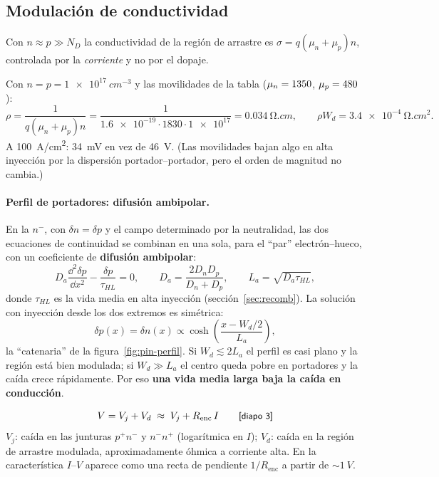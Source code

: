 \subsection{Modulación de conductividad}

Con $n\approx p\gg N_D$ la conductividad de la región de arrastre es
$\sigma=q(\mu_n+\mu_p)n$, controlada por la \emph{corriente} y no por el dopaje.

\begin{ejemplo}
Con $n=p=\SI{1e17}{cm^{-3}}$ y las movilidades de la tabla ($\mu_n=1350$, $\mu_p=480$):
\[
  \rho=\frac{1}{q(\mu_n+\mu_p)n}=\frac{1}{\num{1.6e-19}\cdot1830\cdot\num{1e17}}=\SI{0.034}{\ohm.cm},
  \qquad
  \rho W_d=\SI{3.4e-4}{\ohm.cm^2}.
\]
A \SI{100}{A/cm^2}: \SI{34}{mV} en vez de \SI{46}{V}. (Las movilidades bajan algo en alta
inyección por la dispersión portador--portador, pero el orden de magnitud no cambia.)
\end{ejemplo}

\paragraph{Perfil de portadores: difusión ambipolar.}
En la $n^-$, con $\delta n=\delta p$ y el campo determinado por la neutralidad, las dos ecuaciones
de continuidad se combinan en una sola, para el ``par'' electrón--hueco, con un coeficiente de
\textbf{difusión ambipolar}:
\[
  D_a\frac{\dd^2\delta p}{\dd x^2}-\frac{\delta p}{\tau_{HL}}=0,
  \qquad D_a=\frac{2D_nD_p}{D_n+D_p},\qquad L_a=\sqrt{D_a\tau_{HL}},
\]
donde $\tau_{HL}$ es la vida media en alta inyección (sección~\ref{sec:recomb}). La solución con
inyección desde los dos extremos es simétrica:
\[
  \delta p(x)=\delta n(x)\propto\cosh\!\left(\frac{x-W_d/2}{L_a}\right),
\]
la ``catenaria'' de la figura~\ref{fig:pin-perfil}. Si $W_d\lesssim 2L_a$ el perfil es casi plano y la
región está bien modulada; si $W_d\gg L_a$ el centro queda pobre en portadores y la caída crece
rápidamente. Por eso \textbf{una vida media larga baja la caída en conducción}.

\begin{clave}
\[
  V=V_j+V_d\;\approx\;V_j+R_{\mathrm{enc}}\,I \qquad\text{{\small\textsf{[diapo~3]}}}
\]
$V_j$: caída en las junturas $p^+n^-$ y $n^-n^+$ (logarítmica en $I$); $V_d$: caída en la región de
arrastre modulada, aproximadamente óhmica a corriente alta. En la característica $I$--$V$ aparece como
una recta de pendiente $1/R_{\mathrm{enc}}$ a partir de $\sim\SI{1}{V}$.
\end{clave}


